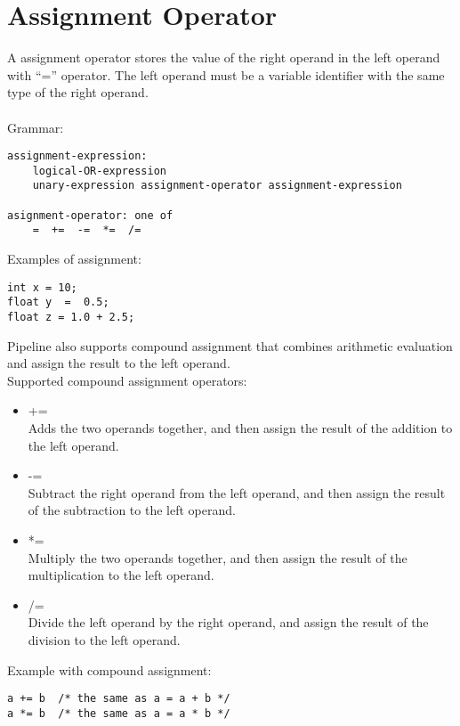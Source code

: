 \documentclass[./LRM_main.tex]{subfiles}
\begin{document}
\section{Assignment Operator}
A assignment operator stores the value of the right operand in the left operand with “=” operator. The left operand must be a variable identifier with the same type of the right operand.\\
\vspace{1 mm}\\
Grammar:
\begin{lstlisting}
assignment-expression:
    logical-OR-expression
    unary-expression assignment-operator assignment-expression
    
asignment-operator: one of
    =  +=  -=  *=  /=
\end{lstlisting}
\vspace{1 mm}
Examples of assignment:
\begin{lstlisting}
int x = 10; 
float y  =  0.5;  
float z = 1.0 + 2.5;
\end{lstlisting}	
Pipeline also supports compound assignment that combines arithmetic evaluation and assign the result to the left operand. \\
Supported compound assignment operators: \\
\begin{itemize}
\item +=\\
Adds the two operands together, and then assign the result of the addition to the left operand.\\
\item -=\\
Subtract the right operand from the left operand, and then assign the result of the subtraction to the left operand.\\
\item *=\\
Multiply the two operands together, and then assign the result of the multiplication to the left operand.\\
\item /=\\
Divide the left operand by the right operand, and assign the result of the division to the left operand.\\
\end{itemize}
Example with compound assignment:
\begin{lstlisting}
a += b  /* the same as a = a + b */
a *= b  /* the same as a = a * b */
\end{lstlisting}
\end{document}
